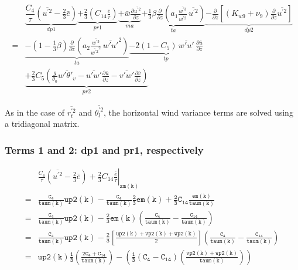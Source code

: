 \documentclass[11pt,fleqn]{article}
\newcommand{\ptlder}[2]{\frac{\partial #1}{\partial #2}}
\begin{document}
\begin{equation}
\begin{split}
\label{eq_up2_ss}
& \underbrace{
  \dfrac{C_4}{\tau} 
  \left(
    \overline{u^{'2}} - \frac{2}{3} \bar{e}
  \right)}_{dp1}
  \underbrace{
   + \frac{2}{3} 
     \left( 
        C_{14} \frac{\bar{e}}{\tau} 
     \right)}_{pr1}
  \underbrace{ 
+ \bar{w}\ptlder{\overline{u^{'2}}}{z} }_{ma}
  \underbrace{
+ \frac{1}{3} \beta
   \ptlder{}{z}
     \left( 
       a_1
       \frac{\overline{w^{'3}}}{\overline{w^{'2}}} \,
       \overline{u^{'2}}
     \right) }_{ta}
  \underbrace{
- \ptlder{}{z} \left[ \left( K_{w9} + \nu_9 \right)
                      \ptlder{}{z} \overline{u^{'2}}
               \right] }_{dp2}  \\
=&   \underbrace{
   - \left( 1 - \frac{1}{3}\beta \right)
       \ptlder{}{z}
         \left( 
           a_2
           \frac{\overline{w^{'3}}}{\overline{w^{'2}}^2} \,
           \overline{w'u'}^2
         \right) }_{ta}
     \underbrace{
   - 2 (1 - C_{5} ) \, \overline{w'u'} \, \ptlder{\bar{u}}{z} }_{tp} \\
 &   \underbrace{
   + \frac{2}{3} C_5
     \left(
       \frac{g}{\theta_0} \overline{w'\theta'_v} 
       - \overline{u'w'}\ptlder{\bar{u}}{z} 
       - \overline{v'w'}\ptlder{\bar{v}}{z} 
     \right) }_{pr2}
\end{split}
\end{equation}

As in the case of $\overline{r_t^{'2}}$ and $\overline{\theta_l^{'2}}$, the 
horizontal wind variance terms are solved using a tridiagonal matrix.

\subsubsection{Terms 1 and 2:  dp1 and pr1, respectively}
%
\begin{equation}
\begin{split}
 & \left. \frac{C_4}{\tau} 
    \left(
      \overline{u^{'2}} - \frac{2}{3} \bar{e}
    \right) 
   + \frac{2}{3} C_{14} \frac{\bar{e}}{\tau} \right|_{\mathtt{zm(k)}} \\
=& \mathtt{
   \frac{C_4}{taum(k)} up2(k)
   -\frac{C_4}{taum(k)} \frac{2}{3} em(k)
   + \frac{2}{3} C_{14} \frac{em(k)}{taum(k)}
    } \\
=& \mathtt{
   \frac{C_4}{taum(k)} up2(k) - \frac{2}{3} em(k) 
   \left( 
     \frac{C_4}{taum(k)} - \frac{C_{14}}{taum(k)}
   \right) 
   } \\
=& \mathtt{
   \frac{C_4}{taum(k)} up2(k) - \frac{2}{3}
   \left[
     \frac{up2(k) + vp2(k) + wp2(k)}{2}
   \right]
   \left( 
     \frac{C_4}{taum(k)} - \frac{C_{14}}{taum(k)}
   \right) 
   } \\
=& \mathtt{
   up2(k) 
   \frac{1}{3} \left(
      \frac{2 C_4 + C_{14}}{taum(k)}
   \right)
 - \left( 
     \frac{1}{3} 
     \left(
        C_4 - C_{14}
     \right)
     \left(
        \frac{vp2(k) + wp2(k)}{taum(k)}
     \right)
   \right) 
   }
\end{split}
\end{equation}
%
\end{document}
